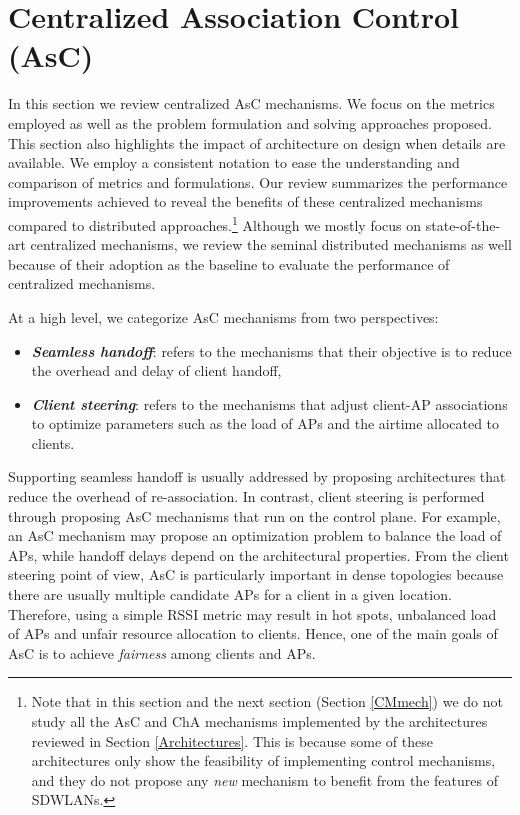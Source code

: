 

\section{Centralized Association Control (AsC)}
\label{AMmech}
In this section we review centralized AsC mechanisms. 
We focus on the metrics employed as well as the problem formulation and solving approaches proposed. 
This section also highlights the impact of architecture on design when details are available.
We employ a consistent notation to ease the understanding and comparison of metrics and formulations.
Our review summarizes the performance improvements achieved to reveal the benefits of these centralized mechanisms compared to distributed approaches.\footnote{Note that in this section and the next section (Section \ref{CMmech}) we do not study all the AsC and ChA mechanisms implemented by the architectures reviewed in Section \ref{Architectures}. 
This is because some of these architectures only show the feasibility of implementing control mechanisms, and they do not propose any \textit{new} mechanism to benefit from the features of SDWLANs.}
Although we mostly focus on state-of-the-art centralized mechanisms, we review the seminal distributed mechanisms as well because of their adoption as the baseline to evaluate the performance of centralized mechanisms.



At a high level, we categorize AsC mechanisms from two perspectives: 
%
\begin{itemize}
	\item \textit{\textbf{Seamless handoff}}: refers to the mechanisms that their objective is to reduce the overhead and delay of client handoff,
	\item \textit{\textbf{Client steering}}: refers to the mechanisms that adjust client-AP associations to optimize parameters such as the load of APs and the airtime allocated to clients.
\end{itemize}
%
Supporting seamless handoff is usually addressed by proposing architectures that reduce the overhead of re-association.
In contrast, client steering is performed through proposing AsC mechanisms that run on the control plane.
For example, an AsC mechanism may propose an optimization problem to balance the load of APs, while handoff delays depend on the architectural properties.
From the client steering point of view, AsC is particularly important in dense topologies because there are usually multiple candidate APs for a client in a given location. 
Therefore, using a simple RSSI metric may result in hot spots, unbalanced load of APs and unfair resource allocation to clients.
Hence, one of the main goals of AsC is to achieve \textit{fairness} among clients and APs. 


